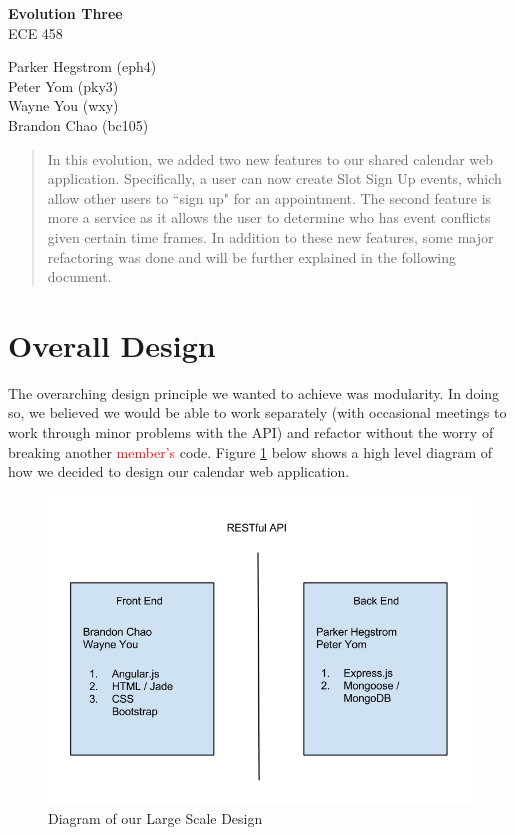 \documentclass[11pt]{article}   %
\newcommand{\dcomment}[1]{\textcolor{red}{#1}}
\begin{document}
\begin{center}

\vspace{3in}
{\Huge{\bf\sc Evolution Three}}\\
\vspace{.1in}
{\small\sc ECE 458}


\vspace{0.3in}



{\large\sc Parker Hegstrom} {\large (eph4)} \\
{\large\sc Peter Yom} {\large (pky3)} \\
{\large\sc Wayne You} {\large (wxy)} \\
{\large\sc Brandon Chao} {\large (bc105)} \\


\end{center}


\vspace{0.2in}

\begin{abstract}
In this evolution, we added two new features to our shared calendar web application. Specifically, a user can now create Slot Sign Up events, which allow other users to ``sign up" for an appointment. The second feature is more a service as it allows the user to determine who has event conflicts given certain time frames. In addition to these new features, some major refactoring was done and will be further explained in the following document.
\end{abstract}

\tableofcontents


\pagebreak


\section{Overall Design}

The overarching design principle we wanted to achieve was modularity. In doing so, we believed we would be able to work separately (with occasional meetings to work through minor problems with the API) and refactor without the worry of breaking another \dcomment{member's} code. Figure \ref{design} below shows a high level diagram of how we decided to design our calendar web application.

\begin{figure}[htb]
\centering
\includegraphics[width=.5\textwidth]{DesignDiagram.png}
\caption{Diagram of our Large Scale Design}
\label{design}
\end{figure}
\end{document}
